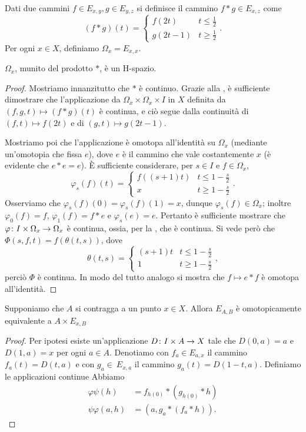 Dati due cammini $f\in E_{x,y},g\in E_{y,z}$ si definisce il cammino $f\ast g\in E_{x,z}$ come
$$
(f\ast g)(t)=
\begin{cases}
f(2t)&t\le\frac{1}{2}\\
g(2t-1)&t\ge\frac{1}{2}
\end{cases}.
$$
Per ogni $x\in X$, definiamo $\Omega_x=E_{x,x}$.
\begin{proposition}
$\Omega_x$, munito del prodotto $\ast$, è un H-spazio.
\end{proposition}
\begin{proof}
Mostriamo innanzitutto che $\ast$ è continuo. Grazie alla , è sufficiente dimostrare che l'applicazione da $\Omega_x\times\Omega_x\times I$ in $X$ definita da $(f,g,t)\mapsto (f\ast g)(t)$ è continua, e ciò segue dalla continuità di $(f,t)\mapsto f(2t)$ e di $(g,t)\mapsto g(2t-1)$.

Mostriamo poi che l'applicazione
è omotopa all'identità su $\Omega_x$ (mediante un'omotopia che fissa $e$), dove $e$ è il cammino che vale costantemente $x$ (è evidente che $e\ast e=e$). È sufficiente considerare, per $s\in I$ e $f\in\Omega_x$, 
$$
\varphi_s(f)(t)=
\begin{cases}
f((s+1)t)&t\le 1-\frac{s}{2}\\
x&t\ge 1-\frac{s}{2}
\end{cases}.
$$
Osserviamo che $\varphi_s(f)(0)=\varphi_s(f)(1)=x$, dunque $\varphi_s(f)\in\Omega_x$; inoltre $\varphi_0(f)=f$, $\varphi_1(f)=f\ast e$ e $\varphi_s(e)=e$. Pertanto è sufficiente mostrare che $\varphi\colon I\times\Omega_x\to\Omega_x$ è continua, ossia, per la , che
è continua. Si vede però che $\Phi(s,f, t)=f(\theta(t,s))$, dove
$$
\theta(t,s)=
\begin{cases}
(s+1)t&t\le 1-\frac{s}{2}\\
1&t\ge 1-\frac{s}{2}
\end{cases},
$$
perciò $\Phi$ è continua. In modo del tutto analogo si mostra che $f\mapsto e\ast f$ è omotopa all'identità.
\end{proof}
\begin{proposition}
Supponiamo che $A$ si contragga a un punto $x\in X$. Allora $E_{A,B}$ è omotopicamente equivalente a $A\times E_{x,B}$
\end{proposition}
\begin{proof}
Per ipotesi esiste un'applicazione $D\colon I\times A\to X$ tale che $D(0,a)=a$ e $D(1,a)=x$ per ogni $a\in A$. Denotiamo con $f_a\in E_{a,x}$ il cammino $f_a(t)=D(t,a)$ e con $g_a\in\ E_{x,a}$ il cammino $g_a(t)=D(1-t,a)$. Definiamo le applicazioni continue
Abbiamo
\begin{align*}
\varphi\psi(h)&=f_{h(0)}\ast(g_{h(0)}\ast h)\\
\psi\varphi(a,h)&=(a,g_a\ast(f_a\ast h)).
\end{align*}
\end{proof}
